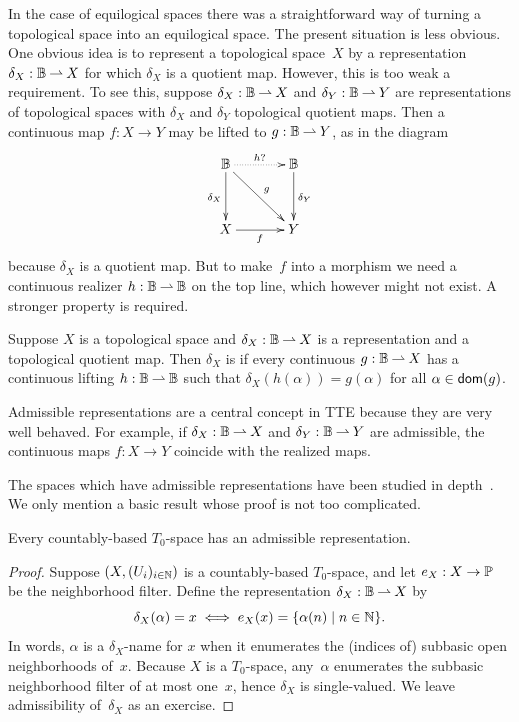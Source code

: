 In the case of equilogical spaces there was a straightforward way of
turning a topological space into an equilogical space. The present
situation is less obvious. One obvious idea is to represent a
topological space~$X$ by a representation $\delta_X : \mathbb{B} \mathbin{\rightharpoonup} X$
for which $\delta_X$ is a quotient map. However, this is too weak a
requirement. To see this, suppose $\delta_X : \mathbb{B} \mathbin{\rightharpoonup} X$ and
$\delta_Y : \mathbb{B} \mathbin{\rightharpoonup} Y$ are representations of topological spaces
with $\delta_X$ and $\delta_Y$ topological quotient maps. Then a
continuous map $f : X \to Y$ may be lifted to $g : \mathbb{B} \mathbin{\rightharpoonup} Y$,
as in the diagram
%
\begin{equation*}
  \xymatrix@+1em{
    {\Baire}
    \ar[d]_{\delta_X}
    \ar[dr]^{g}
    \ar@{..>}[r]^{h?}
    &
    {\Baire}
    \ar[d]^{\delta_Y}
    \\
    {X}
    \ar[r]_f
    &
    {Y}
  }
\end{equation*}
%
because $\delta_X$ is a quotient map. But to make~$f$ into a morphism
we need a continuous realizer $h : \mathbb{B} \mathbin{\rightharpoonup} \mathbb{B}$ on the top
line, which however might not exist. A stronger property is required.

\begin{definition}
  Suppose $X$ is a topological space and $\delta_X : \mathbb{B} \mathbin{\rightharpoonup} X$
  is a representation and a topological quotient map. Then $\delta_X$
  is  if every continuous $g : \mathbb{B} \mathbin{\rightharpoonup} X$ has a
  continuous lifting $h : \mathbb{B} \mathbin{\rightharpoonup} \mathbb{B}$ such that
  $\delta_X(h(\alpha)) = g(\alpha)$ for all $\alpha \in \mathsf{dom}(g)$.
\end{definition}

Admissible representations are a central concept in TTE because they
are very well behaved. For example, if $\delta_X : \mathbb{B} \mathbin{\rightharpoonup} X$
and $\delta_Y : \mathbb{B} \mathbin{\rightharpoonup} Y$ are admissible, the continuous maps
$f : X \to Y$ coincide with the realized maps.

The spaces which have admissible representations have been studied in
depth~. We only mention a basic result whose
proof is not too complicated.

\begin{proposition}
  Every countably-based $T_0$-space has an admissible representation.
\end{proposition}

\begin{proof}
  Suppose $(X, (U_i)_{i \in \mathbb{N}})$ is a countably-based $T_0$-space,
  and let $e_X : X \to \mathbb{P}$ be the neighborhood filter. Define the
  representation $\delta_X : \mathbb{B} \mathbin{\rightharpoonup} X$ by
  \begin{equation*}
    \delta_X(\alpha) = x \iff
    e_X(x) = \{\alpha(n) \mid n \in \mathbb{N}\}.
  \end{equation*}
  In words, $\alpha$ is a $\delta_X$-name for $x$ when it enumerates
  the (indices of) subbasic open neighborhoods of~$x$. Because $X$ is
  a $T_0$-space, any~$\alpha$ enumerates the subbasic neighborhood
  filter of at most one~$x$, hence $\delta_X$ is single-valued. We
  leave admissibility of~$\delta_X$ as an exercise.
\end{proof}

